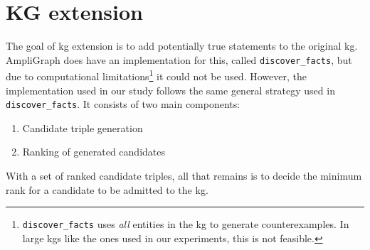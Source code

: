



\newpage

\section{KG extension}

The goal of \gls{kg} extension is to add potentially true statements to the original \gls{kg}. AmpliGraph does have an implementation for this, called \texttt{discover\_facts}, but due to computational limitations\footnote{\texttt{discover\_facts} uses \textit{all} entities in the \gls{kg} to generate counterexamples. In large \glspl{kg} like the ones used in our experiments, this is not feasible.} it could not be used.
However, the implementation used in our study follows the same general strategy used in \texttt{discover\_facts}. It consists of two main components:
\begin{enumerate}
    \item Candidate triple generation
    \item Ranking of generated candidates
\end{enumerate}
With a set of ranked candidate triples, all that remains is to decide the minimum rank for a candidate to be admitted to the \gls{kg}.


